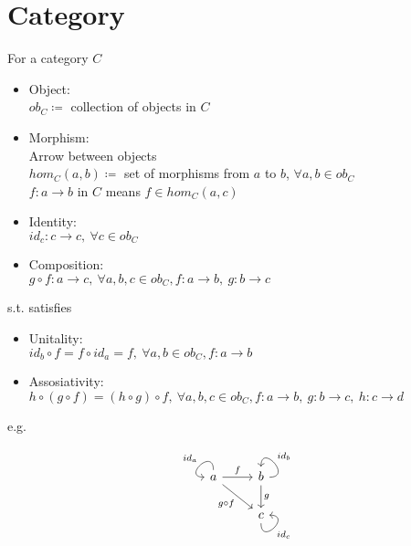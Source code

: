 \documentclass[12pt]{article}
\begin{document}
\tableofcontents
\section{Category}

For a category $C$
\begin{itemize}
  \item Object:\\
    $ob_C \coloneqq$ collection of objects in $C$ 
  \item Morphism:\\
    Arrow between objects\\
    $hom_C(a, b) \coloneqq$ set of morphisms from $a$ to $b$, $\forall a, b \in ob_C$\\
    $f: a \to b$ in $C$ means $f \in hom_C(a,c)$ 
  \item Identity:\\
    $id_c: c \to c,\ \forall c \in ob_C$
  \item Composition:\\
    $g \circ f : a \to c,\ \forall a, b, c \in ob_C, f: a \to b,\ g: b \to c$
\end{itemize}

s.t. satisfies
\begin{itemize}
  \item Unitality:\\
    $id_b \circ f = f \circ id_a = f,\ \forall a, b \in ob_C, f: a \to b$
  \item Assosiativity:\\
    $h \circ (g \circ f) = (h \circ g) \circ f,\ \forall a,b,c\in ob_C, f:a\to b,\ g:b\to c,\ h:c\to d$
\end{itemize}

e.g.
\[\begin{tikzcd}
  a \arrow[out=90, in=180, loop, swap, "id_a", looseness=5]
    \arrow[r, "f"]
    \arrow[dr, swap, "g \circ f"]
  &
  b \arrow[out=0, in=90, loop, swap, "id_b", looseness=4.5]
    \arrow[d, "g"]\\
  &
  c \arrow[out=-90, in=0, swap, "id_c", looseness=5]
\end{tikzcd}\]
\end{document}
